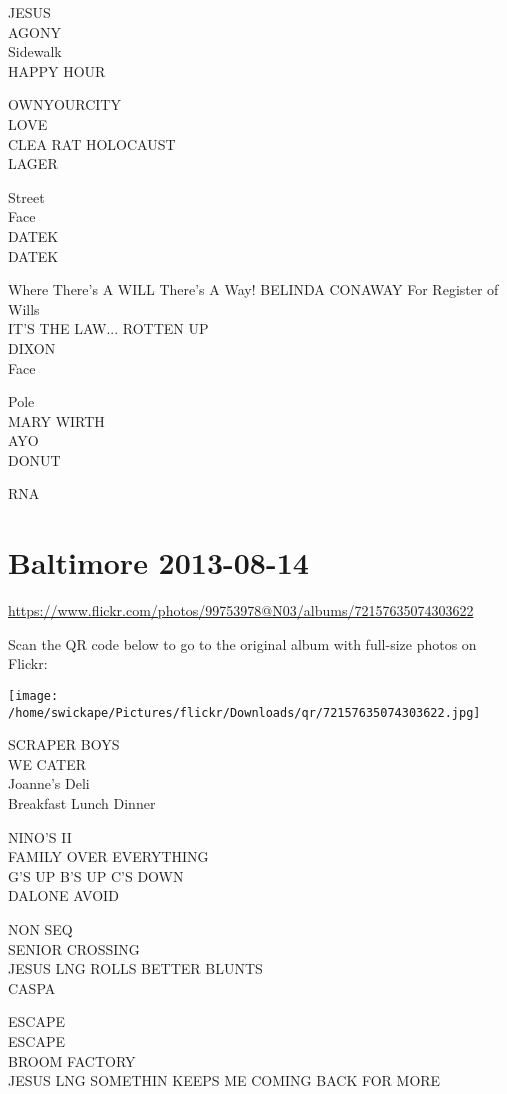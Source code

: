 \documentclass[10pt,letterpaper]{article}
\begin{document}
JESUS\\
AGONY\\
Sidewalk\\
HAPPY HOUR

OWNYOURCITY\\
LOVE\\
CLEA RAT HOLOCAUST\\
LAGER

Street\\
Face\\
DATEK\\
DATEK

Where There's A WILL There's A Way!  BELINDA CONAWAY For Register of Wills\\
IT'S THE LAW... ROTTEN UP\\
DIXON\\
Face

Pole\\
MARY WIRTH\\
AYO\\
DONUT

RNA


\section*{Baltimore 2013-08-14}

\url{https://www.flickr.com/photos/99753978@N03/albums/72157635074303622}

Scan the QR code below to go to the original album with full-size photos on Flickr:

\texttt{[image: /home/swickape/Pictures/flickr/Downloads/qr/72157635074303622.jpg]}


SCRAPER BOYS\\
WE CATER\\
Joanne's Deli\\
Breakfast Lunch Dinner

NINO'S II\\
FAMILY OVER EVERYTHING\\
G'S UP B'S UP C'S DOWN\\
DALONE AVOID

NON SEQ\\
SENIOR CROSSING\\
JESUS LNG ROLLS BETTER BLUNTS\\
CASPA

ESCAPE\\
ESCAPE\\
BROOM FACTORY\\
JESUS LNG SOMETHIN KEEPS ME COMING BACK FOR MORE
\end{document}
